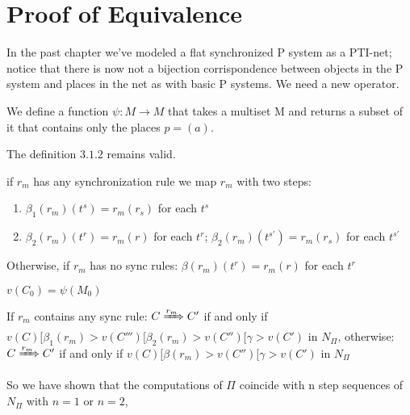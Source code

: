 \chapter{Proof of Equivalence}

In the past chapter we've modeled a flat synchronized P system as a PTI-net; 
notice that there is now not a bijection corrispondence between objects in the P system and places in the net as with basic P systems.
We need a new operator.

\begin{definition}
We define a function $\psi: M \rightarrow M$ that takes a multiset M and returns a subset of it 
that contains only the places $p=(a)$.
\end{definition}

The definition \hyperref[def:map_conf]{$3.1.2$} remains valid.

\begin{definition}
if $r_m$ has any synchronization rule we map $r_m$ with two steps:
\begin{enumerate}
    \item $\beta_1(r_m)(t^s)=r_m(r_s)$ for each $t^s$
    \item $\beta_2(r_m)(t^r)=r_m(r)$ for each $t^r$;
    $\beta_2(r_m)(t^{s'})=r_m(r_s)$ for each $t^{s'}$    
\end{enumerate}
Otherwise, if $r_m$ has no sync rules: $\beta(r_m)(t^r)=r_m(r)$ for each $t^r$
\end{definition}

\begin{fact}[]
$v(C_0)=\psi(M_{0})$
\end{fact}

\begin{fact}[]
If $r_m$ contains any sync rule: 
$C \xRightarrow{r_m} C'$ if and only if 
$v(C)[\beta_1(r_m)> v(C''') [\beta_2(r_m)>v(C'')[\gamma>v(C')$ in $N_\Pi$,
otherwise: $C \xRightarrow{r_m} C'$ if and only if 
$v(C)[\beta(r_m)>v(C'')[\gamma>v(C')$ in $N_\Pi$
\end{fact}

So we have shown that the computations of $\Pi$ coincide with n step sequences of $N_\Pi$ with $n=1$ or $n=2$, 